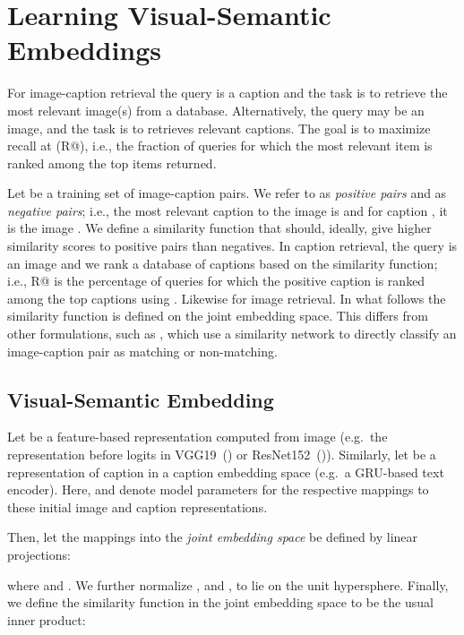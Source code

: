 \section{Learning Visual-Semantic Embeddings}



For image-caption retrieval the query is a caption and the task is to 
retrieve the most relevant image(s) from a database. Alternatively, the 
query may 
be an image, and the task is to retrieves relevant captions.  The goal is to 
maximize recall at  (R@), i.e., the fraction of queries for which the 
most relevant item is ranked among the top  items returned.

Let  be a training set of image-caption pairs.  
We refer to  as {\em positive pairs}\/ and  as 
{\em negative pairs}\/; i.e., the most relevant caption to the image  is 
 and for caption , it is the image .  We define a similarity 
function  that should, ideally, give higher similarity 
scores to positive pairs than negatives.  In caption retrieval, the query 
is an image and we rank a database of captions based on the similarity 
function; i.e., R@ is the percentage of queries for which the positive 
caption is ranked among the top  captions using .  Likewise 
for image retrieval.  In what follows the similarity function is defined 
on the joint embedding space.  This differs from other formulations, such 
as \cite{wang2017learning}, which use a similarity network to directly 
classify an image-caption pair as matching or non-matching.

\vspace{-3mm}
\subsection{Visual-Semantic Embedding}

Let  be a feature-based representation 
computed from image  (e.g.\ the representation before logits in 
VGG19~(\cite{simonyan2014very}) or ResNet152~(\cite{he2016deep})).  
Similarly, let  be a representation
of caption  in a caption embedding space (e.g.\ a GRU-based text 
encoder).  Here,  and  denote model 
parameters for the respective mappings to these initial 
image and caption representations.

Then, let the mappings into the {\em joint embedding space}\/ 
be defined by linear projections:

where  and .
We further normalize , and , 
to lie on the unit hypersphere.  Finally, we define the similarity 
function in the joint embedding space to be the usual inner product:


